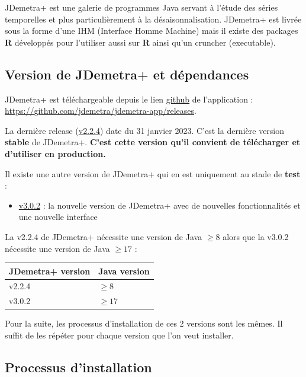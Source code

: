 \documentclass[
]{article}
\providecommand{\tightlist}{%
  \setlength{\itemsep}{0pt}\setlength{\parskip}{0pt}}
\begin{document}
JDemetra+ est une galerie de programmes Java servant à l'étude des
séries temporelles et plus particulièrement à la désaisonnalisation.
JDemetra+ est livrée sous la forme d'une IHM (Interface Homme Machine)
mais il existe des packages \textbf{R} développés pour l'utiliser aussi
sur \textbf{R} ainsi qu'un cruncher (executable).

\hypertarget{version-de-jdemetra-et-duxe9pendances}{%
\subsection{Version de JDemetra+ et
dépendances}\label{version-de-jdemetra-et-duxe9pendances}}

JDemetra+ est téléchargeable depuis le lien
\href{https://github.com/jdemetra/jdemetra-app/releases}{github} de
l'application :
\textcolor{html_color}{\url{https://github.com/jdemetra/jdemetra-app/releases}}.

La dernière release
(\href{https://github.com/jdemetra/jdemetra-app/releases/tag/v2.2.4}{v2.2.4})
date du 31 janvier 2023. C'est la dernière version \textbf{stable} de
JDemetra+. \textbf{C'est cette version qu'il convient de télécharger et
d'utiliser en production.}

Il existe une autre version de JDemetra+ qui en est uniquement au stade
de \textbf{test} :

\begin{itemize}
\tightlist
\item
  \href{https://github.com/jdemetra/jdplus-main/releases/tag/v3.0.2}{v3.0.2}
  : la nouvelle version de JDemetra+ avec de nouvelles fonctionnalités
  et une nouvelle interface
\end{itemize}

La v2.2.4 de JDemetra+ nécessite une version de Java \(\geq 8\) alors
que la v3.0.2 nécessite une version de Java \(\geq 17\) :

\begin{longtable}[]{@{}ll@{}}
\toprule()
JDemetra+ version & Java version \\
\midrule()
\endhead
v2.2.4 & \(\geq 8\) \\
v3.0.2 & \(\geq 17\) \\
\bottomrule()
\end{longtable}

Pour la suite, les processus d'installation de ces 2 versions sont les
mêmes. Il suffit de les répéter pour chaque version que l'on veut
installer.

\hypertarget{processus-dinstallation}{%
\subsection{Processus d'installation}\label{processus-dinstallation}}
\end{document}
